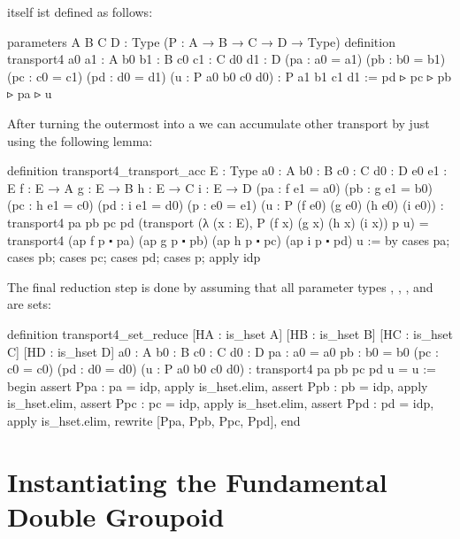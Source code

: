  itself ist defined as follows:
\begin{leancode}
  parameters {A B C D : Type} (P : A → B → C → D → Type)
  definition transport4 {a0 a1 : A} {b0 b1 : B} {c0 c1 : C} {d0 d1 : D}
    (pa : a0 = a1) (pb : b0 = b1) (pc : c0 = c1) (pd : d0 = d1)
    (u : P a0 b0 c0 d0) : P a1 b1 c1 d1 :=
  pd ▹ pc ▹ pb ▹ pa ▹ u
\end{leancode}

After turning the outermost  into a  we can
accumulate other transport by just using the following lemma:
\begin{leancode}
  definition transport4_transport_acc {E : Type}
    {a0 : A} {b0 : B} {c0 : C} {d0 : D}
    {e0 e1 : E} {f : E → A} {g : E → B} {h : E → C} {i : E → D}
    (pa : f e1 = a0) (pb : g e1 = b0) (pc : h e1 = c0) (pd : i e1 = d0)
    (p : e0 = e1) (u : P (f e0) (g e0) (h e0) (i e0)) :
  transport4 pa pb pc pd (transport (λ (x : E), P (f x) (g x) (h x) (i x)) p u)
  = transport4 (ap f p ⬝ pa) (ap g p ⬝ pb) (ap h p ⬝ pc) (ap i p ⬝ pd) u :=
  by cases pa; cases pb; cases pc; cases pd; cases p; apply idp
\end{leancode}

The final reduction step is done by assuming that all parameter types ,
, , and  are sets:
\begin{leancodebr}
  definition transport4_set_reduce [HA : is_hset A] [HB : is_hset B]
    [HC : is_hset C] [HD : is_hset D]
    {a0 : A} {b0 : B} {c0 : C} {d0 : D}
    {pa : a0 = a0} {pb : b0 = b0} (pc : c0 = c0) (pd : d0 = d0)
    (u : P a0 b0 c0 d0) :
    transport4 pa pb pc pd u = u :=
  begin
    assert Ppa : pa = idp, apply is_hset.elim,
    assert Ppb : pb = idp, apply is_hset.elim,
    assert Ppc : pc = idp, apply is_hset.elim,
    assert Ppd : pd = idp, apply is_hset.elim,
    rewrite [Ppa, Ppb, Ppc, Ppd],
  end
\end{leancodebr}

\section{Instantiating the Fundamental Double Groupoid}





